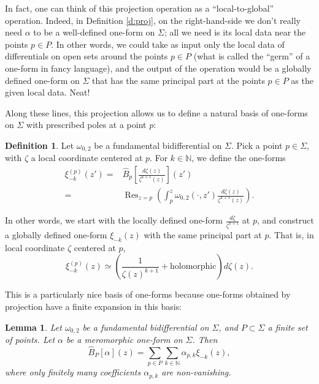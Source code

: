 \documentclass[reqno,oneside,11pt]{amsart}
\theoremstyle{plain}
\newtheorem{lemma}[theorem]{Lemma}
\theoremstyle{definition}
\newtheorem{definition}[theorem]{Definition}
\theoremstyle{remark}
\numberwithin{equation}{section}
\DeclareMathOperator*{\Res}{Res}
\begin{document}
In fact, one can think of this projection operation as a ``local-to-global'' operation. Indeed, in Definition \ref{d:proj}, on the right-hand-side we don't really need $\alpha$ to be a well-defined one-form on $\Sigma$; all we need is its local data near the points $p \in P$. In other words, we could take as input only the local data of differentials on open sets around the points $p \in P$ (what is called the ``germ'' of a one-form in fancy language), and the output of the operation would be a globally defined one-form on $\Sigma$ that has the same principal part at the points $p \in P$ as the given local data. Neat!

Along these lines, this projection allows us to define a natural basis of one-forms on $\Sigma$ with prescribed poles at a point $p$:

\begin{definition}\label{d:xi}
Let $\omega_{0,2}$ be a fundamental bidifferential on $\Sigma$. Pick a point $p \in \Sigma$, with $\zeta$ a local coordinate centered at $p$. For $k \in \mathbb{N}$, we define the one-forms
\begin{align}
 \xi^{(p)}_{-k}(z') =& \hat{B}_p\left[ \frac{d \zeta(z)}{\zeta^{k+1}(z)} \right] (z') \\
 =&
  \Res_{z=p} \left( \int^{z}_{p} \omega_{0,2}(\cdot, z') \frac{d \zeta(z)}{\zeta^{k+1}(z)} \right).
\end{align}
\end{definition}

In other words, we start with the locally defined one-form $\frac{d \zeta}{\zeta^{k+1}}$ at $p$, and construct a globally defined one-form $\xi_{-k}(z)$ with the same principal part at $p$. That is, in local coordinate $\zeta$ centered at $p$, 
\begin{equation}
\xi^{(p)}_{-k}(z) \simeq \left( \frac{1}{\zeta(z)^{k+1}} + \text{holomorphic} \right) d \zeta(z).
\end{equation}

This is a particularly nice basis of one-forms because one-forms obtained by projection have a finite expansion in this basis:
\begin{lemma}\label{l:finite}
Let $\omega_{0,2}$ be a fundamental bidifferential on $\Sigma$, and $P \subset \Sigma$ a finite set of points. Let $\alpha$ be a meromorphic one-form on $\Sigma$. Then
\begin{equation}
\hat{B}_P[\alpha](z) = \sum_{p \in P} \sum_{k\in \mathbb{N}} \alpha_{p,k} \xi_{-k}(z),
\end{equation}
where only finitely many coefficients $\alpha_{p,k}$ are non-vanishing.
\end{lemma}
\end{document}
